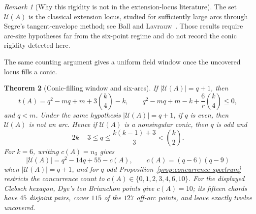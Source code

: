 \documentclass[11pt]{article}
\newtheorem{theorem}{Theorem}[section]
\theoremstyle{definition}
\theoremstyle{remark}
\newtheorem{remark}[theorem]{Remark}
\newcommand{\cU}{\mathcal{U}}
\begin{document}
\begin{remark}[Why this rigidity is not in the extension-locus literature]
The set $\cU(A)$ is the classical extension locus, studied for sufficiently
large arcs through Segre's tangent-envelope method; see Ball and
Lavrauw~\cite[Thms.~39--41]{BallLavrauw2019}. Those results require
arc-size hypotheses far from the six-point regime and do not record the
conic rigidity detected here.
\end{remark}

The same counting argument gives a uniform field window once the uncovered
locus fills a conic.

\begin{theorem}[Conic-filling window and six-arcs]
\label{cor:conic-filling-window}
If $|\cU(A)|=q+1$, then
\[
 t(A)=q^2-mq+m+3\binom{k}{4}-k,\qquad
 q^2-mq+m-k+\frac{6}{r}\binom{k}{4}\le0,
\]
and $q<m$. Under the same hypothesis $|\cU(A)|=q+1$, if $q$ is even,
then $\cU(A)$ is not an arc. Hence if
$\cU(A)$ is a nonsingular conic, then $q$ is odd and
\[
 2k-3\le q\le\frac{k(k-1)+3}{3}<\binom{k}{2}.
\]
For $k=6$, writing $c(A)=n_3$ gives
\[
 |\cU(A)|=q^2-14q+55-c(A),\qquad
 c(A)=(q-6)(q-9)
\]
when $|\cU(A)|=q+1$, and for $q$ odd
Proposition~\ref{prop:concurrence-spectrum} restricts the concurrence count
to $c(A)\in\{0,1,2,3,4,6,10\}$. For the displayed Clebsch hexagon, Dye's ten
Brianchon points give $c(A)=10$; its fifteen chords have $45$ disjoint
pairs, cover $115$ of the $127$ off-arc points, and leave exactly twelve
uncovered.
\end{theorem}
\end{document}
